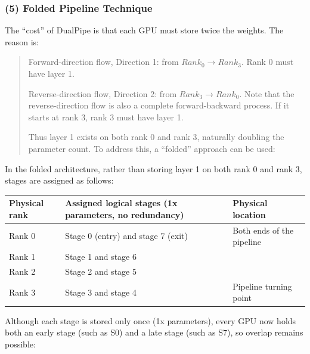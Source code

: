 \hypertarget{folded-pipeline-technique}{%
\subsubsection{(5) Folded Pipeline Technique}\label{folded-pipeline-technique}}

The ``cost'' of DualPipe is that each GPU must store twice the weights. The reason is:

\begin{quote}
Forward-direction flow, Direction 1: from \(Rank_0 \rightarrow Rank_3\). Rank 0 must have layer 1.

Reverse-direction flow, Direction 2: from \(Rank_3 \rightarrow Rank_0\). Note that the reverse-direction flow is also a complete forward-backward process. If it starts at rank 3, rank 3 must have layer 1.

Thus layer 1 exists on both rank 0 and rank 3, naturally doubling the parameter count.
To address this, a ``folded'' approach can be used:
\end{quote}

In the folded architecture, rather than storing layer 1 on both rank 0 and rank 3, stages are assigned as follows:

\begin{longtable}[]{@{}
  >{\raggedright\arraybackslash}p{}
  >{\raggedright\arraybackslash}p{}
  >{\raggedright\arraybackslash}p{}@{}}
\toprule
Physical rank & Assigned logical stages (1x parameters, no redundancy) & Physical location \\
\midrule
\endhead
Rank 0 & Stage 0 (entry) and stage 7 (exit) & Both ends of the pipeline \\
Rank 1 & Stage 1 and stage 6 & \\
Rank 2 & Stage 2 and stage 5 & \\
Rank 3 & Stage 3 and stage 4 & Pipeline turning point \\
\bottomrule
\end{longtable}

Although each stage is stored only once (1x parameters), every GPU now holds both an early stage (such as S0) and a late stage (such as S7), so overlap remains possible:

